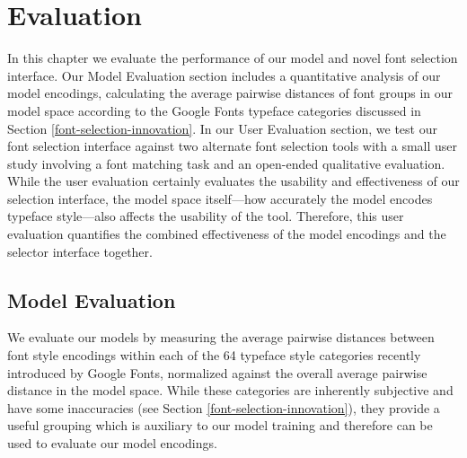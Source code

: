 \chapter{Evaluation}
\label{chap:evaluation}

In this chapter we evaluate the performance of our model and novel font selection interface. Our Model Evaluation section includes a quantitative analysis of our model encodings, calculating the average pairwise distances of font groups in our model space according to the Google Fonts typeface categories discussed in Section \ref{font-selection-innovation}. In our User Evaluation section, we test our font selection interface against two alternate font selection tools with a small user study involving a font matching task and an open-ended qualitative evaluation. While the user evaluation certainly evaluates the usability and effectiveness of our selection interface, the model space itself---how accurately the model encodes typeface style---also affects the usability of the tool. Therefore, this user evaluation quantifies the combined effectiveness of the model encodings and the selector interface together.

\section{Model Evaluation} \label{model-eval}

We evaluate our models by measuring the average pairwise distances between font style encodings within each of the 64 typeface style categories recently introduced by Google Fonts, normalized against the overall average pairwise distance in the model space. While these categories are inherently subjective and have some inaccuracies (see Section \ref{font-selection-innovation}), they provide a useful grouping which is auxiliary to our model training and therefore can be used to evaluate our model encodings.

